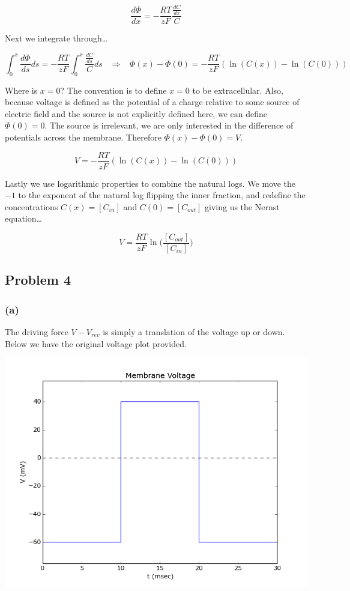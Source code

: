 \documentclass[letterpaper,10pt,english]{/usr/share/sphinx/texinputs/sphinxhowto}
\begin{document}
\[\frac{d\Phi}{dx}=-\frac{RT}{zF}\frac{\frac{dC}{dx}}{C}\]

Next we integrate through\ldots{}

\[\int_0^x \frac{d\Phi}{ds} ds = -\frac{RT}{zF} \int_0^x \frac{\frac{dC}{ds}}{C} ds \hspace{10pt} \Rightarrow \hspace{10pt} \Phi(x)-\Phi(0) = -\frac{RT}{zF}(\ln(C(x))-\ln(C(0)))\]

Where is $x=0$? The convention is to define $x=0$ to be extracellular.
Also, because voltage is defined as the potential of a charge relative
to some source of electric field and the source is not explicitly
defined here, we can define $\Phi(0)=0$. The source is irrelevant, we
are only interested in the difference of potentials across the membrane.
Therefore $\Phi(x)-\Phi(0) = V$.

\[V = -\frac{RT}{zF}(\ln(C(x))-\ln(C(0)))\]

Lastly we use logarithmic properties to combine the natural logs. We
move the $-1$ to the exponent of the natural log flipping the inner
fraction, and redefine the concentrations $C(x)=[C_{in}]$ and
$C(0)=[C_{out}]$ giving us the Nernst equation\ldots{}

\[V = \frac{RT}{zF}\ln\Big(\frac{[C_{out}]}{[C_{in}]}\Big)\]\subsection{Problem 4}\label{problem-4}

\subsubsection{(a)}\label{a}

The driving force $V-V_{rev}$ is simply a translation of the voltage up
or down. Below we have the original voltage plot provided.

\includegraphics[scale=.5]{vRest.png}
\end{document}
